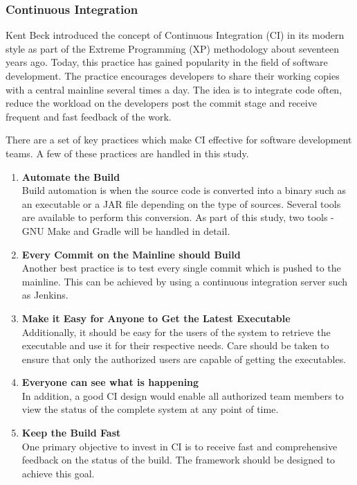 \documentclass[12pt, a4paper, titlepage]{scrartcl}
\begin{document}
\subsubsection{Continuous Integration}
\par Kent Beck introduced the concept of Continuous Integration (CI) in its modern style as part of the Extreme Programming (XP) methodology about seventeen years ago\cite{beck2000extreme}. Today, this practice has gained popularity in the field of software development. The practice encourages developers to share their working copies with a central mainline several times a day. The idea is to integrate code often, reduce the workload on the developers post the commit stage and receive frequent and fast feedback of the work. 
\par There are a set of key practices which make CI effective for software development teams\cite{fowler2006continuous}. A few of these practices are handled in this study. 
\begin{enumerate}
\item \textbf{Automate the Build} \\
Build automation is when the source code is converted into a binary such as an executable or a JAR file depending on the type of sources. Several tools are available to perform this conversion. As part of this study, two tools - GNU Make and Gradle will be handled in detail. 
\item \textbf{Every Commit on the Mainline should Build} \\
Another best practice is to test every single commit which is pushed to the mainline. This can be achieved by using a continuous integration server  such as Jenkins. 
\item \textbf{Make it Easy for Anyone to Get the Latest Executable} \\
Additionally, it should be easy for the users of the system to retrieve the executable and use it for their respective needs. Care should be taken to ensure that only the authorized users are capable of getting the executables.
\item \textbf{Everyone can see what is happening} \\
In addition, a good CI design would enable all authorized team members to view the status of the complete system at any point of time.  
\item \textbf{Keep the Build Fast} \\
One primary objective to invest in CI is to receive fast and comprehensive feedback on the status of the build. The framework should be designed to achieve this goal. 
\end{enumerate}
\end{document}
